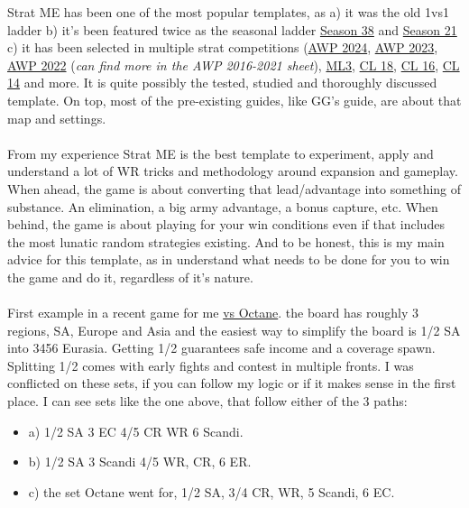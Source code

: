 Strat ME has been one of the most popular templates, as a) it was the old 1vs1 ladder b) it's been featured twice as the seasonal ladder \href{https://www.warzone.com/LadderSeason?ID=4069}{Season 38} and \href{https://www.warzone.com/LadderSeason?ID=4020}{Season 21} c) it has been selected in multiple strat competitions (\href{https://www.warzone.com/MultiPlayer/Tournament?ID=56704}{AWP 2024}, \href{https://www.warzone.com/MultiPlayer/Tournament?ID=51304}{AWP 2023}, \href{https://www.warzone.com/MultiPlayer/Tournament?ID=47859}{AWP 2022} (\textit{can find more in the AWP 2016-2021 sheet}), \href{https://docs.google.com/spreadsheets/d/1xk1MMZo14ujGI823fZLqzK6_4j00x8YZf4GnK_8dvVA/edit?usp=sharing}{ML3}, \href{https://docs.google.com/spreadsheets/d/1-CXBKQ8pDioH2Cu6dKtZlO9qlyReanwGysu27a1D590/edit?gid=19021413#gid=19021413}{CL 18}, \href{https://docs.google.com/spreadsheets/d/1oVI29Qupn9jqAZ1eBbzvewCjzlDTZZsdBkYLAOy6crs/edit}{CL 16}, \href{https://docs.google.com/spreadsheets/d/1-M-IGtNTlpuVhHO4RlQQjEIEDUF-5ln91xQH5DB6Pwk/edit?gid=323930043#gid=323930043}{CL 14} and more. It is quite possibly the tested, studied and thoroughly discussed template. On top, most of the pre-existing guides, like GG's guide, are about that map and settings.
\\
\\
From my experience Strat ME is the best template to experiment, apply and understand a lot of WR tricks and methodology around expansion and gameplay. When ahead, the game is about converting that lead/advantage into something of substance. An elimination, a big army advantage, a bonus capture, etc. When behind, the game is about playing for your win conditions even if that includes the most lunatic random strategies existing. And to be honest, this is my main advice for this template, as in understand what needs to be done for you to win the game and do it, regardless of it's nature.
\\
\\
First example in a recent game for me \href{https://www.warzone.com/MultiPlayer?GameID=41475154}{vs Octane}. the board has roughly 3 regions, SA, Europe and Asia and the easiest way to simplify the board is 1/2 SA into 3456 Eurasia. Getting 1/2 guarantees safe income and a coverage spawn. Splitting 1/2 comes with early fights and contest in multiple fronts. I was conflicted on these sets, if you can follow my logic or if it makes sense in the first place. I can see sets like the one above, that follow either of the 3 paths: 
\begin{itemize}
    \item a) 1/2 SA 3 EC 4/5 CR WR 6 Scandi.
    \item b) 1/2 SA 3 Scandi 4/5 WR, CR, 6 ER.
    \item c) the set Octane went for, 1/2 SA, 3/4 CR, WR, 5 Scandi, 6 EC.
\end{itemize}


